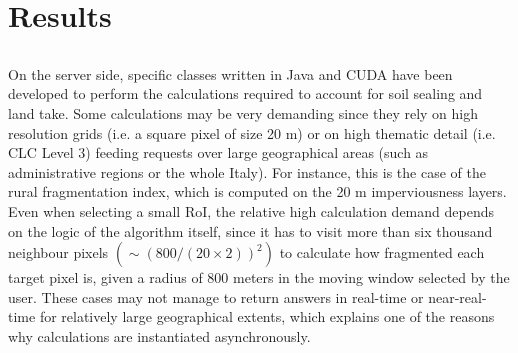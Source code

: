 \documentclass[APA,LATO1COL,doublespace]{WileyNJD-v2}
\begin{document}
\section{ Results }

\subsection{ }
On the server side, specific classes written in Java and CUDA have been developed to perform the calculations required to account for soil sealing and land take. 
Some calculations may be very demanding since they rely on high resolution grids (i.e. a square pixel of size 20 m) or on high thematic detail (i.e. CLC Level 3) feeding requests over large geographical areas (such as administrative regions or the whole Italy). For instance, this is the case of the rural fragmentation index, which is computed on the 20 m imperviousness layers. 
Even when selecting a small RoI, the relative high calculation demand depends on the logic of the algorithm itself, since it has to visit more than six thousand neighbour pixels $\left( \sim ( 800/\left(20\times2\right) )^2 \right)$ to calculate how fragmented each target pixel is, given a radius of 800 meters in the moving window selected by the user.
These cases may not manage to return answers in real-time or near-real-time for relatively large geographical extents, which explains one of the reasons why calculations are instantiated asynchronously.
\end{document}

